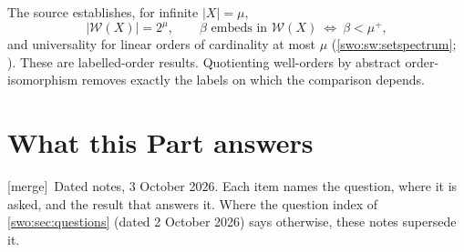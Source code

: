 \documentclass[11pt]{article}
\theoremstyle{definition}
\theoremstyle{remark}
\newcommand{\WO}{\mathcal W}
\newcommand{\merge}{\textsf{[merge]}}
\begin{document}
The source establishes, for infinite $|X|=\mu$,
\[
 |\WO(X)|=2^\mu,
 \qquad
 \beta\text{ embeds in }\WO(X)\ \Longleftrightarrow\ \beta<\mu^+,
\]
and universality for linear orders of cardinality at most $\mu$
(\cref{swo:sw:setspectrum}; \cite{ProveItReals}). These are labelled-order results. Quotienting
well-orders by abstract order-isomorphism removes exactly the labels on
which the comparison depends.

\section{What this Part answers}\label{swo:vi:sec:status}

\merge\ Dated notes, 3 October 2026. Each item names the question, where it is
asked, and the result that answers it. Where the question index of
\cref{swo:sec:questions} (dated 2 October 2026) says otherwise, these notes
supersede it.
\end{document}
